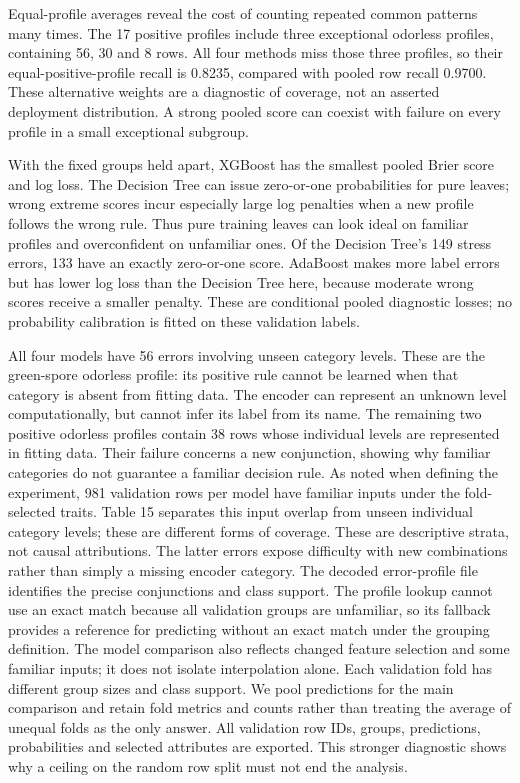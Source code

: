 \documentclass[11pt]{article}
\begin{document}

Equal-profile averages reveal the cost of counting repeated common patterns many times. The 17 positive profiles include three exceptional odorless profiles, containing 56, 30 and 8 rows. All four methods miss those three profiles, so their equal-positive-profile recall is 0.8235, compared with pooled row recall 0.9700. These alternative weights are a diagnostic of coverage, not an asserted deployment distribution. A strong pooled score can coexist with failure on every profile in a small exceptional subgroup.

With the fixed groups held apart, XGBoost has the smallest pooled Brier score and log loss. The Decision Tree can issue zero-or-one probabilities for pure leaves; wrong extreme scores incur especially large log penalties when a new profile follows the wrong rule. Thus pure training leaves can look ideal on familiar profiles and overconfident on unfamiliar ones. Of the Decision Tree's 149 stress errors, 133 have an exactly zero-or-one score. AdaBoost makes more label errors but has lower log loss than the Decision Tree here, because moderate wrong scores receive a smaller penalty. These are conditional pooled diagnostic losses; no probability calibration is fitted on these validation labels.

All four models have 56 errors involving unseen category levels. These are the green-spore odorless profile: its positive rule cannot be learned when that category is absent from fitting data. The encoder can represent an unknown level computationally, but cannot infer its label from its name. The remaining two positive odorless profiles contain 38 rows whose individual levels are represented in fitting data. Their failure concerns a new conjunction, showing why familiar categories do not guarantee a familiar decision rule. As noted when defining the experiment, 981 validation rows per model have familiar inputs under the fold-selected traits. Table 15 separates this input overlap from unseen individual category levels; these are different forms of coverage. These are descriptive strata, not causal attributions. The latter errors expose difficulty with new combinations rather than simply a missing encoder category. The decoded error-profile file identifies the precise conjunctions and class support.
The profile lookup cannot use an exact match because all validation groups are unfamiliar, so its fallback provides a reference for predicting without an exact match under the grouping definition. The model comparison also reflects changed feature selection and some familiar inputs; it does not isolate interpolation alone. Each validation fold has different group sizes and class support. We pool predictions for the main comparison and retain fold metrics and counts rather than treating the average of unequal folds as the only answer. All validation row IDs, groups, predictions, probabilities and selected attributes are exported. This stronger diagnostic shows why a ceiling on the random row split must not end the analysis.
\end{document}
